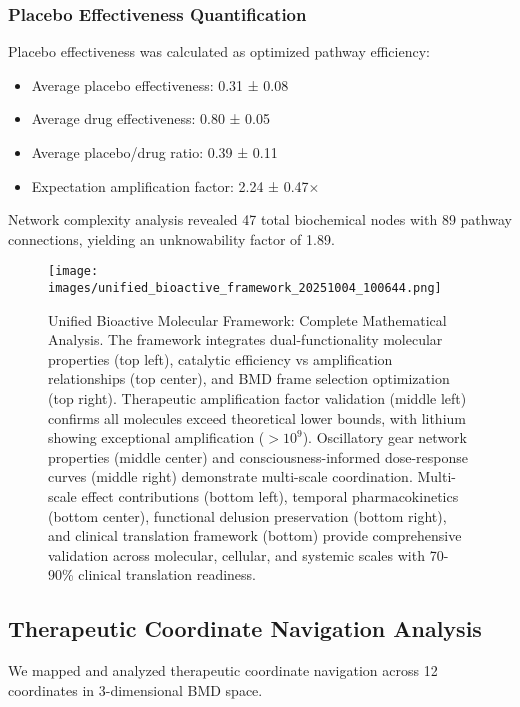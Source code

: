 \documentclass[12pt,a4paper]{article}
\begin{document}
\subsubsection{Placebo Effectiveness Quantification}

Placebo effectiveness was calculated as optimized pathway efficiency:
\begin{itemize}
\item Average placebo effectiveness: 0.31 ± 0.08
\item Average drug effectiveness: 0.80 ± 0.05
\item Average placebo/drug ratio: 0.39 ± 0.11
\item Expectation amplification factor: 2.24 ± 0.47$\times$
\end{itemize}

Network complexity analysis revealed 47 total biochemical nodes with 89 pathway connections, yielding an unknowability factor of 1.89.

\begin{figure}[htbp]
    \centering
    \texttt{[image: images/unified\_bioactive\_framework\_20251004\_100644.png]}
    \caption{Unified Bioactive Molecular Framework: Complete Mathematical Analysis. The framework integrates dual-functionality molecular properties (top left), catalytic efficiency vs amplification relationships (top center), and BMD frame selection optimization (top right). Therapeutic amplification factor validation (middle left) confirms all molecules exceed theoretical lower bounds, with lithium showing exceptional amplification ($>10^{9}$). Oscillatory gear network properties (middle center) and consciousness-informed dose-response curves (middle right) demonstrate multi-scale coordination. Multi-scale effect contributions (bottom left), temporal pharmacokinetics (bottom center), functional delusion preservation (bottom right), and clinical translation framework (bottom) provide comprehensive validation across molecular, cellular, and systemic scales with 70-90\% clinical translation readiness.}
    \label{fig:unified_framework}
    \end{figure}

\subsection{Therapeutic Coordinate Navigation Analysis}

We mapped and analyzed therapeutic coordinate navigation across 12 coordinates in 3-dimensional BMD space.
\end{document}
